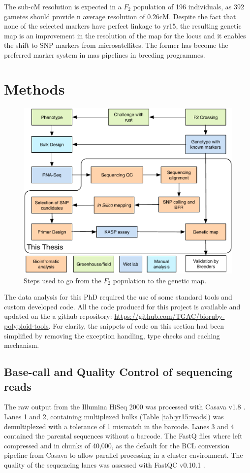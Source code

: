 The sub-cM resolution is expected in a $F_{2}$ population of 196 individuals, as 392 gametes should provide n average resolution of 0.26cM. 
Despite the fact that none of the selected markers have perfect linkage to \gls{yr15}, the resulting genetic map is an improvement in the resolution of the map for the locus and it enables the shift to SNP markers from microsatellites. The former has become the preferred marker system in \gls{mas} pipelines in breeding programmes. 


\section{Methods}
\label{yr15:methods}

\begin{figure}
\includegraphics[width=1\textwidth]{Yr15/Figures/pipeline.pdf}
\caption{Steps used to go from the $F_{2}$ population to the genetic map.}
\end{figure}

The data analysis for this PhD required the use of some standard tools and custom developed code. 
All the code produced for this project is available and updated on the a github repository: \url{https://github.com/TGAC/bioruby-polyploid-tools}. 
For clarity, the snippets of code on this section had been simplified by removing the exception handling, type checks and caching mechanism.

\subsection{Base-call and Quality Control of sequencing reads}
The raw output from the Illumina HiSeq 2000 was processed with Casava v1.8 \citep{casavaBCL}. 
Lanes 1 and 2, containing multiplexed bulks (Table \ref{tab:yr15:reads}) was demultiplexed with a tolerance of 1 mismatch in the barcode. 
Lanes 3 and 4 contained the parental sequences without a barcode. 
The FastQ files where left compressed and in chunks of 40,000, as the default for the BCL conversion pipeline from Casava to allow parallel processing in a cluster environment. 
The quality of the sequencing lanes was assessed with FastQC v0.10.1 \citep{fastqc}. 

